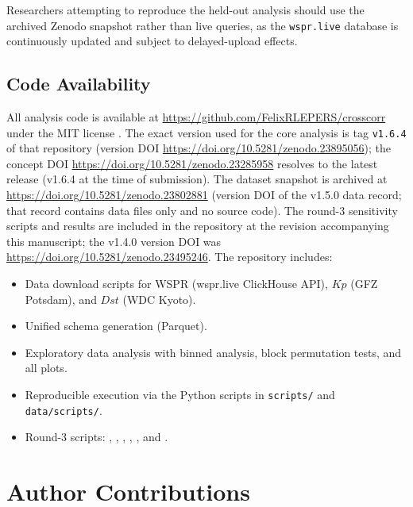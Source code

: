 \documentclass{agujournal2019}
\begin{document}
{\sloppy
Researchers attempting to reproduce the held-out analysis should use the
archived Zenodo snapshot rather than live queries, as the
\texttt{wspr.live} database is continuously updated and subject to
delayed-upload effects.
\par}

\subsection*{Code Availability}

All analysis code is available at
\url{https://github.com/FelixRLEPERS/crosscorr}
under the MIT license \citep{crosscorr_code}. The exact version used for the
core analysis is tag \texttt{v1.6.4} of that repository (version DOI
\url{https://doi.org/10.5281/zenodo.23895056}); the concept DOI
\url{https://doi.org/10.5281/zenodo.23285958} resolves to the latest
release (v1.6.4 at the time of submission). The dataset snapshot is
archived at
\url{https://doi.org/10.5281/zenodo.23802881} (version DOI of the
v1.5.0 data record; that record contains data files only and no source
code). The round-3 sensitivity scripts and results are included in
the repository at the revision accompanying this manuscript; the
v1.4.0 version DOI was
\url{https://doi.org/10.5281/zenodo.23495246}. The repository includes:

{\sloppy
\begin{itemize}
	\item Data download scripts for WSPR (wspr.live ClickHouse API),
	      $Kp$ (GFZ Potsdam), and $Dst$ (WDC Kyoto).
	\item Unified schema generation (Parquet).
	\item Exploratory data analysis with binned analysis, block permutation
	      tests, and all plots.
	\item Reproducible execution via the Python scripts in \texttt{scripts/} and \texttt{data/scripts/}.
	\item Round-3 scripts: ,
	      ,
	      ,
	      ,
	      , and
	      .
\end{itemize}
\par}


\section*{Author Contributions}
\end{document}
